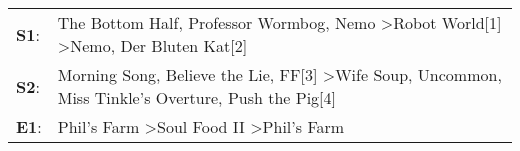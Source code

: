 \begin{supertabular}{p{0.03\textwidth}p{0.92\textwidth}}
 \textbf{S1}:  &                                  The Bottom Half\textsuperscript{}, \enspace Professor Wormbog\textsuperscript{}, \enspace Nemo\textsuperscript{} \textgreater \enspace Robot World[1]\textsuperscript{} \textgreater \enspace Nemo\textsuperscript{}, \enspace Der Bluten Kat[2]\textsuperscript{}  \enspace  \\
 \textbf{S2}:  &  Morning Song\textsuperscript{}, \enspace Believe the Lie\textsuperscript{}, \enspace FF[3]\textsuperscript{} \textgreater \enspace Wife Soup\textsuperscript{}, \enspace Uncommon\textsuperscript{}, \enspace Miss Tinkle's Overture\textsuperscript{}, \enspace Push the Pig[4]\textsuperscript{}  \enspace  \\
 \textbf{E1}:  &                                                                                                                                                              Phil's Farm\textsuperscript{} \textgreater \enspace Soul Food II\textsuperscript{} \textgreater \enspace Phil's Farm\textsuperscript{}  \enspace  \\
\end{supertabular}
